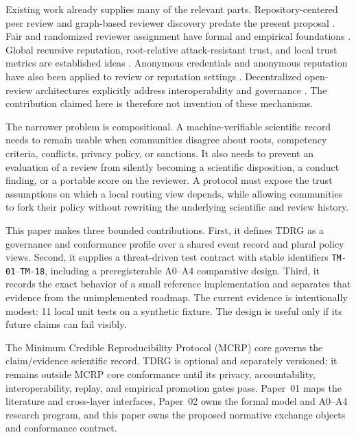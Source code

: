 \documentclass[11pt]{article}
\newcommand{\tdrg}{TDRG}
\newcommand{\testid}[1]{\texttt{#1}}
\begin{document}
Existing work already supplies many of the relevant parts. Repository-centered
peer review and graph-based reviewer discovery predate the present proposal
\citep{rodriguez2006convergence}. Fair and randomized reviewer assignment have
formal and empirical foundations \citep{stelmakh2021peerreview4all,jecmen2020mitigating}.
Global recursive reputation, root-relative attack-resistant trust, and local trust
metrics are established ideas \citep{kamvar2003eigentrust,levien1998attack,massa2005controversial}.
Anonymous credentials and anonymous reputation have also been applied to review or
reputation settings \citep{naessens2006fair,zhai2016anonrep}. Decentralized open-review
architectures explicitly address interoperability and governance
\citep{tenoriofornes2021decentralizing}. The contribution claimed here is therefore
not invention of these mechanisms.

The narrower problem is compositional. A machine-verifiable scientific record needs
to remain usable when communities disagree about roots, competency criteria,
conflicts, privacy policy, or sanctions. It also needs to prevent an evaluation of a
review from silently becoming a scientific disposition, a conduct finding, or a
portable score on the reviewer. A protocol must expose the trust assumptions on
which a local routing view depends, while allowing communities to fork their policy
without rewriting the underlying scientific and review history.

This paper makes three bounded contributions. First, it defines \tdrg{} as a
governance and conformance profile over a shared event record and plural policy
views. Second, it supplies a threat-driven test contract with stable identifiers
\testid{TM-01}--\testid{TM-18}, including a preregisterable A0--A4 comparative
design. Third, it records the exact behavior of a small reference implementation
and separates that evidence from the unimplemented roadmap. The current evidence
is intentionally modest: 11 local unit tests on a synthetic fixture. The design is
useful only if its future claims can fail visibly.

The Minimum Credible Reproducibility Protocol (MCRP) core governs the claim/evidence
scientific record. \tdrg{} is optional and separately versioned; it remains outside
MCRP core conformance until its privacy, accountability, interoperability, replay,
and empirical promotion gates pass. Paper~01 maps the literature and cross-layer
interfaces, Paper~02 owns the formal model and A0--A4 research program, and this
paper owns the proposed normative exchange objects and conformance contract.
\end{document}

